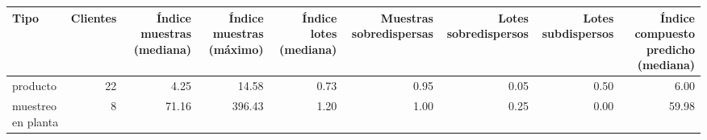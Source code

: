 \begin{tabular}{lrrrrrrrr}
\toprule
Tipo & Clientes & Índice muestras (mediana) & Índice muestras (máximo) & Índice lotes (mediana) & Muestras sobredispersas & Lotes sobredispersos & Lotes subdispersos & Índice compuesto predicho (mediana) \\
\midrule
producto & 22 & 4.25 & 14.58 & 0.73 & 0.95 & 0.05 & 0.50 & 6.00 \\
muestreo en planta & 8 & 71.16 & 396.43 & 1.20 & 1.00 & 0.25 & 0.00 & 59.98 \\
\bottomrule
\end{tabular}
